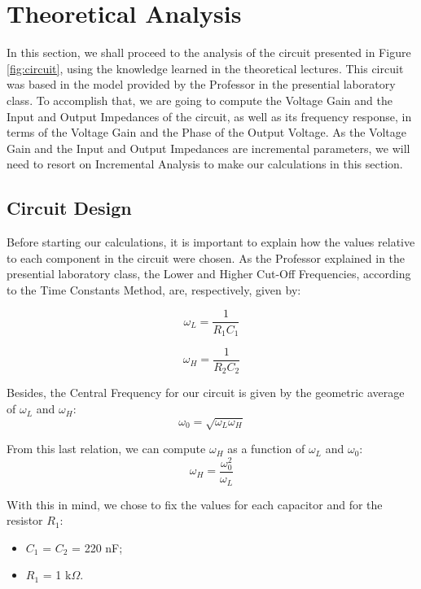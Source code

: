 \section{Theoretical Analysis}
\label{sec:analysis}

In this section, we shall proceed to the analysis of the circuit presented in Figure \ref{fig:circuit}, using the knowledge learned in the theoretical lectures. This circuit was based in the model provided by the Professor in the presential laboratory class. To accomplish that, we are going to compute the Voltage Gain and the Input and Output Impedances of the circuit, as well as its frequency response, in terms of the Voltage Gain and the Phase of the Output Voltage. As the Voltage Gain and the Input and Output Impedances are incremental parameters, we will need to resort on  Incremental Analysis to make our calculations in this section.

\subsection{Circuit Design} \label{sec:circuitDesign}

Before starting our calculations, it is important to explain how the values relative to each component in the circuit were chosen. As the Professor explained in the presential laboratory class, the Lower and Higher Cut-Off Frequencies, according to the Time Constants Method, are, respectively, given by:

\begin{equation}
	\omega_L = \frac{1}{R_1 C_1}
	\label{eq:omegaL}
\end{equation}

\begin{equation}
	\omega_H = \frac{1}{R_2 C_2}
	\label{eq:omegaH}
\end{equation}

Besides, the Central Frequency for our circuit is given by the geometric average of $\omega_L$ and $\omega_H$:
\begin{equation}
	\omega_0 = \sqrt{\omega_L \omega_H}
	\label{eq:omega0}
\end{equation}

From this last relation, we can compute $\omega_H$ as a function of $\omega_L$ and $\omega_0$:
\begin{equation}
	\omega_H = \frac{\omega_0^2}{\omega_L}
	\label{eq:omegaHAlt}
\end{equation}

With this in mind, we chose to fix the values for each capacitor and for the resistor $R_1$:
\begin{itemize}
	\item $C_1$ = $C_2$ = 220 nF;
	\item $R_1$ = 1 k$\Omega$.
\end{itemize}	

